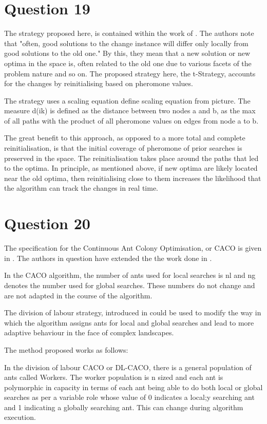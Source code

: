 \documentclass[12pt]{article}
\begin{document}
\section{Question 19}
The strategy proposed here, is contained within the work of \cite{Guntsch2001}. The authors note that "often, good solutions to the change instance will differ only locally from good solutions to the old one." By this, they mean that a new solution or new optima in the space is, often related to the old one due to various facets of the problem nature and so on. The proposed strategy here, the t-Strategy, accounts for the changes by reinitialising based on pheromone values.

The strategy uses a scaling equation {define scaling equation from picture}. The measure d(ik) is defined as the distance between two nodes a and b, as the max of all paths with the product of all pheromone values on edges from node a to b.

The great benefit to this approach, as opposed to a more total and complete reinitialisation, is that the initial coverage of pheromone of prior searches is preserved in the space. The reinitialisation takes place around the paths that led to the optima. In principle, as mentioned above, if new optima are likely located near the old optima, then reinitialising close to them increases the likelihood that the algorithm can track the changes in real time.
\section{Question 20}
The specification for the Continuous Ant Colony Optimisation, or CACO is given in \cite{doi:10.1021/ie990700g}. The authors in question have extended the the work done in \cite{Bilchev1995}.

In the CACO algorithm, the number of ants used for local searches is nl and ng denotes the number used for global searches. These numbers do not change and are not adapted in the course of the algorithm. 

The division of labour strategy, introduced in \cite{Theraulaz327} could be used to modify the way in which the algorithm assigns ants for local and global searches and lead to more adaptive behaviour in the face of complex landscapes.

The method proposed works as follows:

In the division of labour CACO or DL-CACO, there is a general population of ants called Workers. The worker population is n sized and each ant is polymorphic in capacity in terms of each ant being able to do both local or global searches as per a variable role whose value of 0 indicates a local;y searching ant and 1 indicating a globally searching ant. This can change during algorithm execution.
\end{document}
